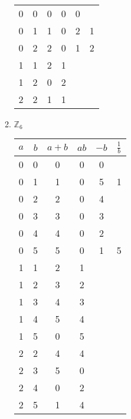\documentclass{article}
\begin{document}
\begin{enumerate}
\begin{enumerate}
\begin{table}[H]
\begin{tabular}{|c|c|c|c|c|c|}
                    \hline
                    0 & 0 & 0   & 0   & 0  &     \\
                    0 & 1 & 1   & 0   & 2  & 1   \\
                    0 & 2 & 2   & 0   & 1  & 2   \\
                    1 & 1 & 2   & 1   &    &     \\
                    1 & 2 & 0   & 2   &    &     \\
                    2 & 2 & 1   & 1   &    &     \\
                    \hline
                    \end{tabular}
                    \end{table}
                    \item $\mathbb{Z}_6$ \begin{table}[H]
                        \centering
                        \begin{tabular}{|c|c|c|c|c|c|}
                        \hline
                        $a$ & $b$ & $a+b$ & $ab$ & $-b$ & $\frac{1}{b}$ \\
                        \hline
                        0 & 0 & 0   & 0   & 0  &     \\
                        0 & 1 & 1   & 0   & 5  & 1   \\
                        0 & 2 & 2   & 0   & 4  &     \\
                        0 & 3 & 3   & 0   & 3  &     \\
                        0 & 4 & 4   & 0   & 2  &     \\
                        0 & 5 & 5   & 0   & 1  & 5   \\
                        1 & 1 & 2   & 1   &    &     \\
                        1 & 2 & 3   & 2   &    &     \\
                        1 & 3 & 4   & 3   &    &     \\
                        1 & 4 & 5   & 4   &    &     \\
                        1 & 5 & 0   & 5   &    &     \\
                        2 & 2 & 4   & 4   &    &     \\
                        2 & 3 & 5   & 0   &    &     \\
                        2 & 4 & 0   & 2   &    &     \\
                        2 & 5 & 1   & 4   &    &     \\

\end{tabular}
\end{table}
\end{enumerate}
\end{enumerate}
\end{document}
